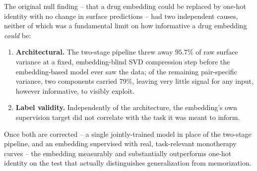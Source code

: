 \documentclass[11pt]{article}
\begin{document}
The original null finding -- that a drug embedding could be replaced by one-hot identity with no change in surface predictions -- had two independent causes, neither of which was a fundamental limit on how informative a drug embedding \emph{could} be:

\begin{enumerate}
\item \textbf{Architectural.} The two-stage pipeline threw away $95.7\%$ of raw surface variance at a fixed, embedding-blind SVD compression step before the embedding-based model ever saw the data; of the remaining pair-specific variance, two components carried 79\%, leaving very little signal for any input, however informative, to visibly exploit.
\item \textbf{Label validity.} Independently of the architecture, the embedding's own supervision target did not correlate with the task it was meant to inform.
\end{enumerate}

Once both are corrected -- a single jointly-trained model in place of the two-stage pipeline, and an embedding supervised with real, task-relevant monotherapy curves -- the embedding measurably and substantially outperforms one-hot identity on the test that actually distinguishes generalization from memorization.
\end{document}

